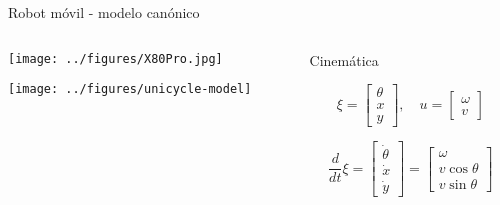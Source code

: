 \documentclass[presentation,aspectratio=169]{beamer}
\begin{document}
\begin{frame}[label={sec:orgabe4a8e}]{Robot móvil - modelo canónico}
\begin{columns}
\begin{column}{0.4\columnwidth}
\begin{center}
 \texttt{[image: ../figures/X80Pro.jpg]}
\end{center}
\begin{center}
 \texttt{[image: ../figures/unicycle-model]}
\end{center}
\end{column}

\begin{column}{0.6\columnwidth}
\pause

\alert{Cinemática}

\[ \xi = \begin{bmatrix} \theta\\x\\y \end{bmatrix},   \quad u = \begin{bmatrix} \omega\\v \end{bmatrix}\]



\[\frac{d}{dt} \xi = \begin{bmatrix} \dot{\theta}\\\dot{x}\\\dot{y} \end{bmatrix} = \begin{bmatrix} \omega\\ v\cos\theta\\v\sin\theta\end{bmatrix} \]


\pause
\end{column}
\end{columns}
\end{frame}
\end{document}
